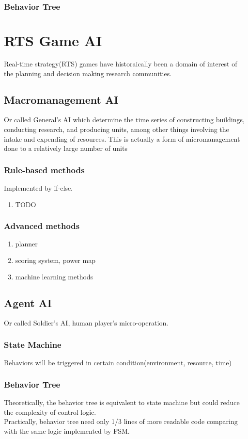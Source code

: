 \documentclass{llncs}
\begin{document}
\subsubsection{Behavior Tree}

\section{RTS Game AI}
Real-time strategy(RTS) games have historaically been a domain of interest of the planning and decision making research communities.
\subsection{Macromanagement AI}
Or called General's AI which determine the time series of constructing buildings, conducting research, and producing units, among other things involving the intake and expending of resources. This is actually a form of micromanagement done to a relatively large number of units
\subsubsection{Rule-based methods}
Implemented by if-else.
\begin{enumerate}
\item TODO
\end{enumerate}

\subsubsection{Advanced methods}
\begin{enumerate}
\item planner
\item scoring system, power map
\item machine learning methods
\end{enumerate}

\subsection{Agent AI}
Or called Soldier's AI, human player's micro-operation.

\subsubsection{State Machine}
Behaviors will be triggered in certain condition(environment, resource, time)

\subsubsection{Behavior Tree}
Theoretically, the behavior tree is equivalent to state machine but could reduce the complexity of control logic.\\
Practically, behavior tree need only 1/3 lines of more readable code  comparing with the same logic implemented by FSM.
\end{document}
